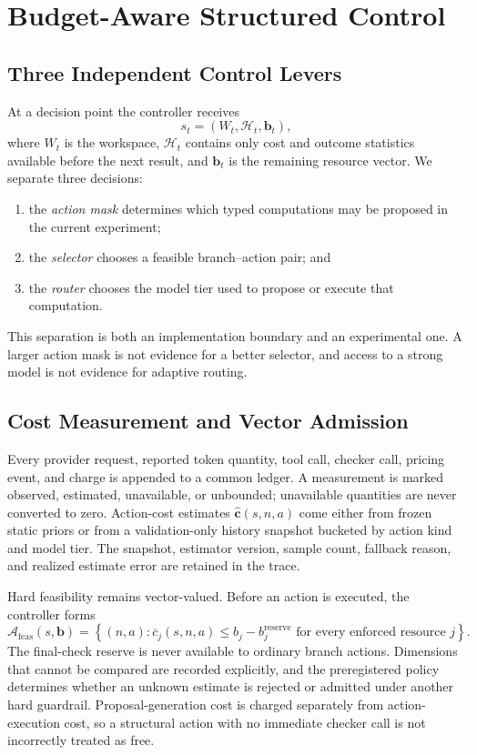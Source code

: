 \section{Budget-Aware Structured Control}

\subsection{Three Independent Control Levers}

At a decision point the controller receives
\[
  s_t=(W_t,\mathcal H_t,\mathbf b_t),
\]
where \(W_t\) is the workspace, \(\mathcal H_t\) contains only cost and
outcome statistics available before the next result, and \(\mathbf b_t\) is the
remaining resource vector. We separate three decisions:

\begin{enumerate}
    \item the \emph{action mask} determines which typed computations may be
    proposed in the current experiment;
    \item the \emph{selector} chooses a feasible branch--action pair; and
    \item the \emph{router} chooses the model tier used to propose or execute
    that computation.
\end{enumerate}

This separation is both an implementation boundary and an experimental one. A
larger action mask is not evidence for a better selector, and access to a
strong model is not evidence for adaptive routing.

\subsection{Cost Measurement and Vector Admission}

Every provider request, reported token quantity, tool call, checker call,
pricing event, and charge is appended to a common ledger. A measurement is
marked observed, estimated, unavailable, or unbounded; unavailable quantities
are never converted to zero. Action-cost estimates
\(\hat{\mathbf c}(s,n,a)\) come either from frozen static priors or from a
validation-only history snapshot bucketed by action kind and model tier. The
snapshot, estimator version, sample count, fallback reason, and realized
estimate error are retained in the trace.

Hard feasibility remains vector-valued. Before an action is executed, the
controller forms
\[
  \mathcal A_{\mathrm{feas}}(s,\mathbf b)
  =\left\{(n,a):
  \overline c_j(s,n,a)
  \le b_j-b_j^{\mathrm{reserve}}
  \text{ for every enforced resource }j\right\}.
\]
The final-check reserve is never available to ordinary branch actions.
Dimensions that cannot be compared are recorded explicitly, and the
preregistered policy determines whether an unknown estimate is rejected or
admitted under another hard guardrail. Proposal-generation cost is charged
separately from action-execution cost, so a structural action with no immediate
checker call is not incorrectly treated as free.

